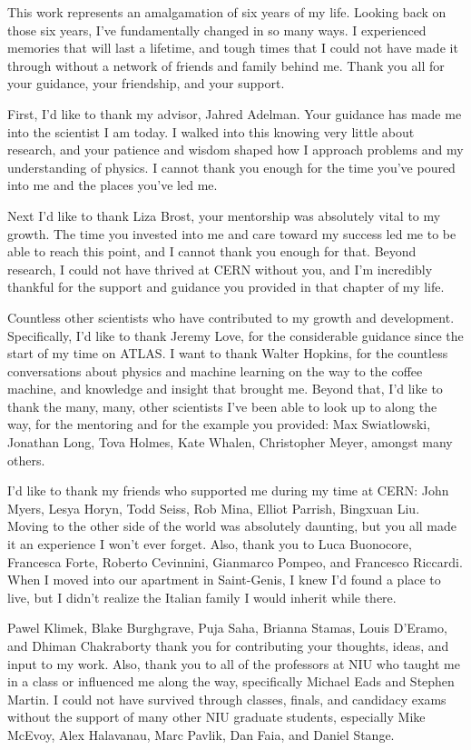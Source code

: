 This work represents an amalgamation of six years of my life. Looking back on those six years, I've fundamentally changed in so many ways. I experienced memories that will last a lifetime, and tough times that I could not have made it through without a network of friends and family behind me. Thank you all for your guidance, your friendship, and your support.

First, I'd like to thank my advisor, Jahred Adelman. Your guidance has made me into the scientist I am today. I walked into this knowing very little about research, and your patience and wisdom shaped how I approach problems and my understanding of physics. I cannot thank you enough for the time you've poured into me and the places you've led me.

Next I'd like to thank Liza Brost, your mentorship was absolutely vital to my growth. The time you invested into me and care toward my success led me to be able to reach this point, and I cannot thank you enough for that. Beyond research, I could not have thrived at CERN without you, and I'm incredibly thankful for the support and guidance you provided in that chapter of my life.

Countless other scientists who have contributed to my growth and development. Specifically, I'd like to thank Jeremy Love, for the considerable guidance since the start of my time on ATLAS. I want to thank Walter Hopkins, for the countless conversations about physics and machine learning on the way to the coffee machine, and knowledge and insight that brought me. Beyond that, I'd like to thank the many, many, other scientists I've been able to look up to along the way, for the mentoring and for the example you provided: Max Swiatlowski, Jonathan Long, Tova Holmes, Kate Whalen, Christopher Meyer, amongst many others.

I'd like to thank my friends who supported me during my time at CERN: John Myers, Lesya Horyn, Todd Seiss, Rob Mina, Elliot Parrish, Bingxuan Liu. Moving to the other side of the world was absolutely daunting, but you all made it an experience I won't ever forget. Also, thank you to Luca Buonocore, Francesca Forte, Roberto Cevinnini, Gianmarco Pompeo, and Francesco Riccardi. When I moved into our apartment in Saint-Genis, I knew I'd found a place to live, but I didn't realize the Italian family I would inherit while there. 

Pawel Klimek, Blake Burghgrave, Puja Saha, Brianna Stamas, Louis D'Eramo, and Dhiman Chakraborty thank you for contributing your thoughts, ideas, and input to my work. Also, thank you to all of the professors at NIU who taught me in a class or influenced me along the way, specifically Michael Eads and Stephen Martin. I could not have survived through classes, finals, and candidacy exams without the support of many other NIU graduate students, especially Mike McEvoy, Alex Halavanau, Marc Pavlik, Dan Faia, and Daniel Stange. 

